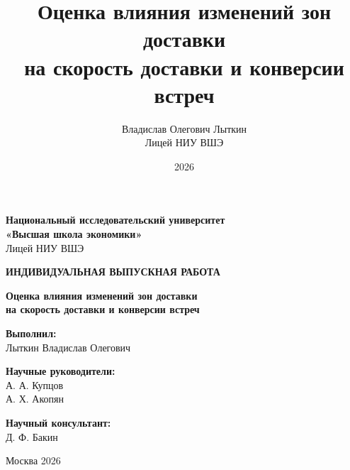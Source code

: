 \documentclass[14pt,a4paper]{extarticle}
\title{
\textbf{Оценка влияния изменений зон доставки\\
на скорость доставки и конверсии встреч}
}
\author{
Владислав Олегович Лыткин\\
Лицей НИУ ВШЭ
}
\date{2026}
\begin{document}
\begin{titlepage}
\begin{center}

\textbf{Национальный исследовательский университет\\
«Высшая школа экономики»}\\
Лицей НИУ ВШЭ

\vspace{4cm}

\textbf{\Large ИНДИВИДУАЛЬНАЯ ВЫПУСКНАЯ РАБОТА}

\vspace{1cm}

\textbf{\LARGE Оценка влияния изменений зон доставки\\
на скорость доставки и конверсии встреч}

\vspace{3cm}

\end{center}

\begin{flushright}
\textbf{Выполнил:}\\
Лыткин Владислав Олегович

\vspace{1cm}

\textbf{Научные руководители:}\\
А. А. Купцов\\
А. Х. Акопян

\vspace{1cm}

\textbf{Научный консультант:}\\
Д. Ф. Бакин

\end{flushright}

\vfill

\begin{center}
Москва 2026
\end{center}

\end{titlepage}

\tableofcontents
\newpage
\end{document}
